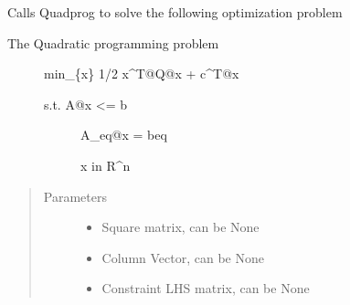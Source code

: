 \documentclass[letterpaper,10pt,english]{sphinxmanual}
\begin{document}
\begin{fulllineitems}
\label{\detokenize{ppopt.solver_interface:ppopt.solver_interface.quad_prog_interface.solve_qp_quadprog}}
\sphinxAtStartPar
Calls Quadprog to solve the following optimization problem
\begin{description}
\item[{The Quadratic programming problem}] \leavevmode
\sphinxAtStartPar
min\_\{x\} 1/2 x\textasciicircum{}T@Q@x + c\textasciicircum{}T@x
\begin{description}
\item[{s.t.   A@x \textless{}= b}] \leavevmode
\sphinxAtStartPar
A\_eq@x = beq

\sphinxAtStartPar
x in R\textasciicircum{}n

\end{description}

\end{description}
\begin{quote}\begin{description}
\item[{Parameters}] \leavevmode\begin{itemize}
\item {} 
\sphinxAtStartPar
{} \textendash{} Square matrix, can be None

\item {} 
\sphinxAtStartPar
{} \textendash{} Column Vector, can be None

\item {} 
\sphinxAtStartPar
{} \textendash{} Constraint LHS matrix, can be None


\end{itemize}
\end{description}
\end{quote}
\end{fulllineitems}
\end{document}
